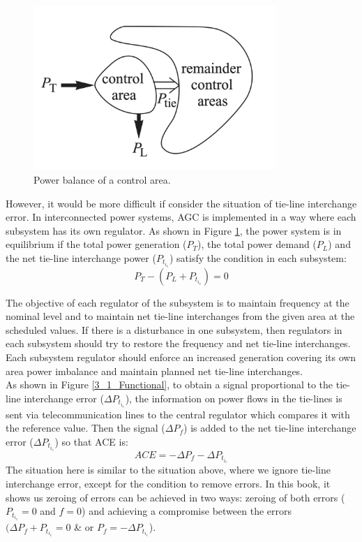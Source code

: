 \documentclass{report}
\begin{document}
\begin{figure}[htbp]
\centering
\includegraphics[width =0.819\textwidth]{figure/3_1_Power.png}
\caption{Power balance of a control area.}
\label{3_1_Power}
\end{figure}

However, it would be more difficult if consider the situation of tie-line interchange error. In interconnected power systems, AGC is implemented in a way where each subsystem has its own regulator. As shown in Figure \textcolor{red}{\ref{3_1_Power}}, the power system is in equilibrium if the total power generation ($P_T$), the total power demand ($P_L$) and the net tie-line interchange power ($P_t_i_e$) satisfy the condition in each subsystem:\\

\begin{equation} \label{eq1}
 P_T - (P_L + P_t_i_e) = 0
\end{equation}

The objective of each regulator of the subsystem is to maintain frequency at the nominal level and to maintain net tie-line interchanges from the given area at the scheduled values. If there is a disturbance in one subsystem, then regulators in each subsystem should try to restore the frequency and net tie-line interchanges. Each subsystem regulator should enforce an increased generation covering its own area power imbalance and maintain planned net tie-line interchanges.\\

As shown in Figure \textcolor{red}{\ref{3_1_Functional}}, to obtain a signal proportional to the tie-line interchange error ($\Delta P_t_i_e$), the information on power ﬂows in the tie-lines is sent via telecommunication lines to the central regulator which compares it with the reference value. Then the signal ($\Delta P_f$) is added to the net tie-line interchange error ($\Delta P_t_i_e$) so that ACE is: 
\begin{equation} \label{eq2}
 ACE = −\Delta P_f − \Delta P_t_i_e 
\end{equation}
The situation here is similar to the situation above, where we ignore tie-line interchange error, except for the condition to remove errors. In this book, it shows us zeroing of errors can be achieved in two ways: zeroing of both errors ($ P_t_i_e = 0 $ and $ f = 0 $) and achieving a compromise between the errors $(\Delta P_f + P_t_i_e = 0 $ & or $ P_f = - \Delta P_t_i_e $).\\
\end{document}
